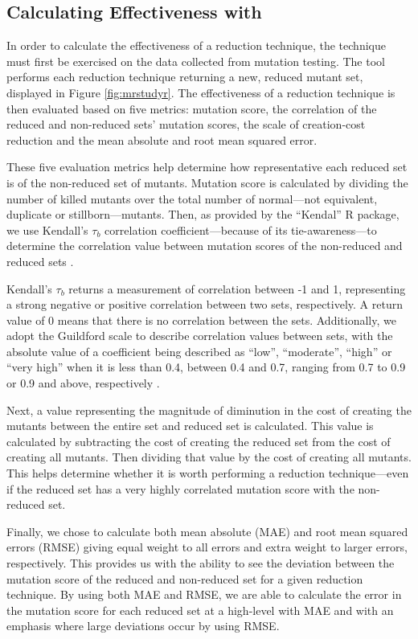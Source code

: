 \subsection{Calculating Effectiveness with \mr}

In order to calculate the effectiveness of a reduction technique, the technique
must first be exercised on the data collected from mutation testing. The \mr tool
performs each reduction technique returning a new, reduced mutant set,
displayed in Figure \ref{fig:mrstudyr}. The effectiveness of a reduction technique is then evaluated
based on five metrics: mutation score, the correlation of the reduced and non-reduced sets' mutation scores,
the scale of creation-cost reduction and the mean absolute and root mean squared error.

These five evaluation metrics help determine how representative each reduced
set is of the non-reduced set of mutants. Mutation score is calculated
by dividing the number of killed mutants over the total number of normal---not
equivalent, duplicate or stillborn---mutants. Then, as provided by the ``Kendal'' R package,
we use Kendall's $\tau_b$ correlation coefficient---because of its tie-awareness---to
determine the correlation value between mutation scores of the non-reduced and reduced sets \cite{mcleod2005kendall}.

Kendall's $\tau_b$ returns a measurement of correlation between -1 and 1, representing
a strong negative or positive correlation between two sets, respectively. A return value
of 0 means that there is no correlation between the sets. Additionally, we adopt the
Guildford scale to describe correlation values between sets, with the absolute value
of a coefficient being described as ``low'', ``moderate'', ``high'' or ``very high'' when
it is less than 0.4, between 0.4 and 0.7, ranging from 0.7 to 0.9 or 0.9 and above, respectively \cite{inozemtseva2014coverage}.

Next, a value representing the magnitude of diminution in the cost of
creating the mutants between the entire set
and reduced set is calculated. This value is calculated by subtracting
the cost of creating the reduced set from the cost of creating all mutants. Then
dividing that value by the cost of creating all mutants. This helps
determine whether it is worth performing a reduction technique---even if the
reduced set has a very highly correlated mutation score with the non-reduced set.

Finally, we chose to calculate both mean absolute (MAE) and root mean
squared errors (RMSE) giving equal weight to
all errors and extra weight to larger errors, respectively. This provides
us with the ability to see the deviation between the mutation score of the reduced and
non-reduced set for a given reduction technique. By using both MAE and RMSE,
we are able to calculate the error in the mutation score for each reduced set
at a high-level with MAE and with an emphasis where large deviations occur by using RMSE.
